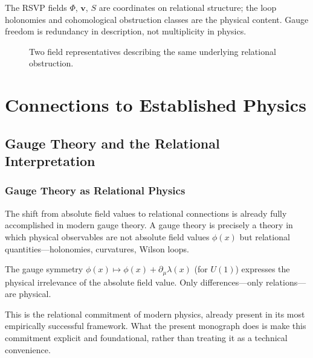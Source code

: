 \documentclass[12pt,a4paper,openany]{book}
\theoremstyle{plain}
\theoremstyle{definition}
\theoremstyle{remark}
\newcommand{\del}{\partial}
\begin{document}
The RSVP fields $\Phi$, $\mathbf{v}$, $S$ are coordinates on relational structure; the loop holonomies and cohomological obstruction classes are the physical content. Gauge freedom is redundancy in description, not multiplicity in physics.

\begin{figure}[h]
\centering
{}
\caption[Gauge equivalence]{Two field representatives describing the same underlying relational obstruction.}
\label{fig:glyph_gauge}
\end{figure}


\part{Connections to Established Physics}

\chapter{Gauge Theory and the Relational Interpretation}

\section{Gauge Theory as Relational Physics}

The shift from absolute field values to relational connections is already fully accomplished in modern gauge theory. A gauge theory is precisely a theory in which physical observables are not absolute field values $\phi(x)$ but relational quantities---holonomies, curvatures, Wilson loops.

The gauge symmetry $\phi(x) \mapsto \phi(x) + \del_\mu \lambda(x)$ (for $U(1)$) expresses the physical irrelevance of the absolute field value. Only differences---only relations---are physical.

This is the relational commitment of modern physics, already present in its most empirically successful framework. What the present monograph does is make this commitment explicit and foundational, rather than treating it as a technical convenience.
\end{document}
